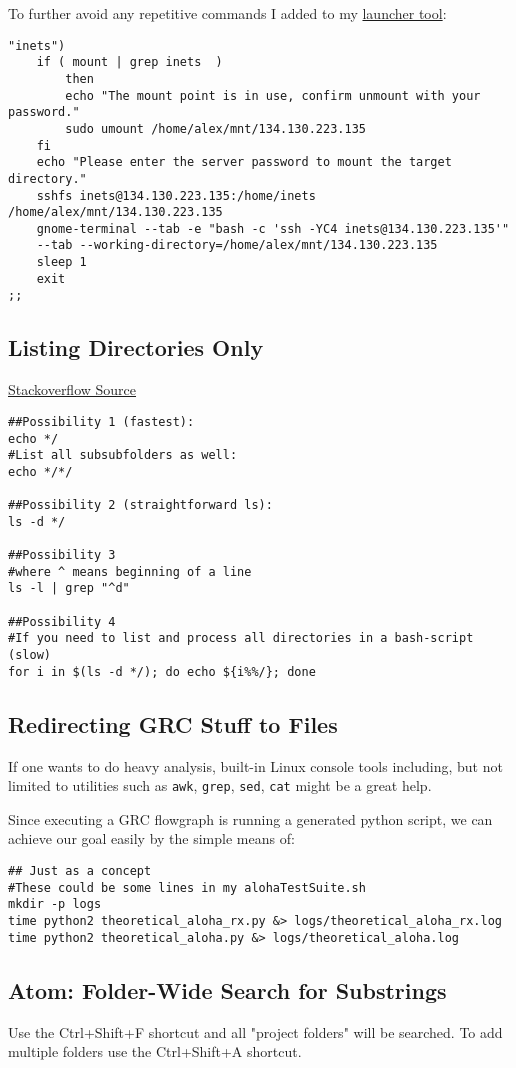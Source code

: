 \documentclass{article}
\begin{document}
To further avoid any repetitive commands I added to my \href{http://alexander-pastor.de/convenient-linux-game-launcher/}{launcher tool}:

\begin{verbatim}
"inets")
	if ( mount | grep inets  )
		then
		echo "The mount point is in use, confirm unmount with your password."
		sudo umount /home/alex/mnt/134.130.223.135
	fi
	echo "Please enter the server password to mount the target directory."
	sshfs inets@134.130.223.135:/home/inets /home/alex/mnt/134.130.223.135
	gnome-terminal --tab -e "bash -c 'ssh -YC4 inets@134.130.223.135'" 
	--tab --working-directory=/home/alex/mnt/134.130.223.135
	sleep 1
	exit
;;
\end{verbatim}

\subsection{Listing Directories Only}

\href{https://stackoverflow.com/questions/14352290/listing-only-directories-using-ls-in-bash-an-examination}{Stackoverflow Source}

\begin{verbatim}
##Possibility 1 (fastest):
echo */
#List all subsubfolders as well:
echo */*/

##Possibility 2 (straightforward ls):
ls -d */

##Possibility 3
#where ^ means beginning of a line
ls -l | grep "^d"

##Possibility 4
#If you need to list and process all directories in a bash-script (slow)
for i in $(ls -d */); do echo ${i%%/}; done
\end{verbatim}

\subsection{Redirecting GRC Stuff to Files}
If one wants to do heavy analysis, built-in Linux console tools including, but not limited to utilities such as \verb|awk|, \verb|grep|, \verb|sed|, \verb|cat| might be a great help.

Since executing a GRC flowgraph is running a generated python script, we can achieve our goal easily by the simple means of:

\begin{verbatim}
## Just as a concept
#These could be some lines in my alohaTestSuite.sh
mkdir -p logs
time python2 theoretical_aloha_rx.py &> logs/theoretical_aloha_rx.log
time python2 theoretical_aloha.py &> logs/theoretical_aloha.log
\end{verbatim}

\subsection{Atom: Folder-Wide Search for Substrings}
Use the Ctrl+Shift+F shortcut and all "project folders" will be searched. To add multiple folders use the Ctrl+Shift+A shortcut.
\end{document}
